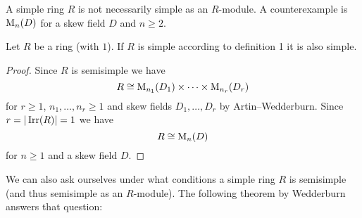 \begin{warn}
  A simple ring $R$ is not necessarily simple as an $R$-module.
  A counterexample is $\operatorname{M}_n(D)$ for a skew field $D$ and $n \geq 2$.
\end{warn}


\begin{lem}
  Let $R$ be a ring (with $1$).
  If $R$ is simple according to definition 1 it is also simple.
\end{lem}
\begin{proof}
  Since $R$ is semisimple we have
  \[
    R \cong \operatorname{M}_{n_1}(D_1) \times \dotsb \times \operatorname{M}_{n_r}(D_r)
  \]
  for $r \geq 1$, $n_1, \dotsc, n_r \geq 1$ and skew fields $D_1, \dotsc, D_r$ by Artin--Wedderburn.
  Since $r = |\operatorname{Irr}(R)| = 1$ we have
  \[
    R \cong \operatorname{M}_n(D)
  \]
  for $n \geq 1$ and a skew field $D$.
\end{proof}


We can also ask ourselves under what conditions a simple ring $R$ is semisimple (and thus semisimple as an $R$-module). The following theorem by Wedderburn answers that question:


